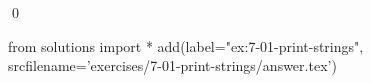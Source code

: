 
\begin{ex}
  \label{ex:7-01-print-strings}
  
  \qed
\end{ex}
\begin{python0}
from solutions import *
add(label="ex:7-01-print-strings",
    srcfilename='exercises/7-01-print-strings/answer.tex')
\end{python0}
